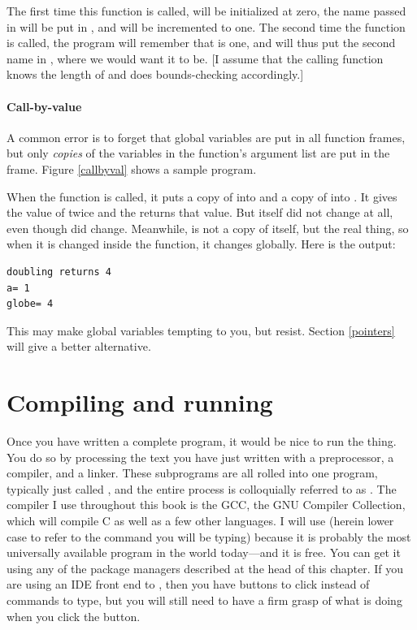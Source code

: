 \documentclass[12pt]{article}
\begin{document}
The first time this function is called, 
will be initialized at zero, the name passed in will be put in
, and  will be
incremented to one. The second time the function is called, the program
will remember that  is one, and will thus put the
second name in , where we would want it to be.
[I assume that the calling function knows the length of
 and does bounds-checking accordingly.]

\paragraph{Call-by-value} 
A common error is to forget that global variables are put in all function
frames, but only {\sl copies} of the variables in the function's argument
list are put in the frame.  Figure \ref{callbyval} shows a sample program.


When the  function is called, it puts a copy of  into  and a copy of 
into . It gives  the value of twice  and the returns that value. But 
itself did not change at all, even though  did change. Meanwhile,  is not a copy of
itself, but the real thing, so when it is changed inside the function, it changes globally.
Here is the output:
\begin{lstlisting}
doubling returns 4
a= 1
globe= 4
\end{lstlisting}

This may make global variables tempting to you, but resist. Section \ref{pointers} will give a better
alternative.

\section{Compiling and running}\label{compilation}  

Once you have written a complete program, it would be nice to run the
thing. You do so by processing the text you have just written with a
preprocessor, a compiler, and a linker. These subprograms are all rolled
into one program, typically just called , and the entire
process is colloquially referred to as . The compiler I use
throughout this book is the GCC, the GNU Compiler Collection, which will
compile C as well as a few other languages. I will use  (herein
lower case to refer to the command you will be typing) because it is probably
the most universally available program in the world today---and it is free.
You can get it using any of the package managers described at the head
of this chapter. If you are using an IDE front end to ,
then you have buttons to click instead of commands to type, but you will
still need to have a firm grasp of what  is doing when you
click the  button.
\end{document}
